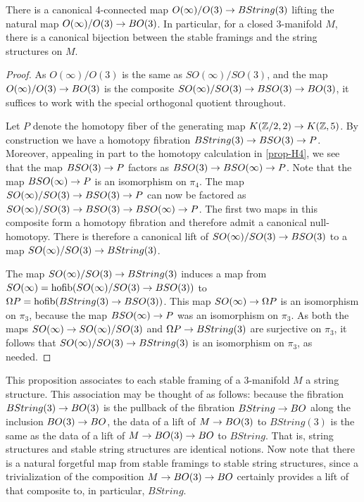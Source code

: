 \documentclass{amsart}
\begin{document}
\begin{proposition}
There is a canonical 4-connected map $O(\infty)/O(3) \rightarrow BString(3)$ lifting the natural map $O(\infty)/O(3) \rightarrow BO(3)$.  In particular, for a closed 3-manifold $M$, there is a canonical bijection between the stable framings and the string structures on $M$.
\end{proposition} 
\begin{proof}
As $O(\infty)/O(3)$ is the same as $SO(\infty)/SO(3)$, and the map $O(\infty)/O(3) \rightarrow BO(3)$ is the composite $SO(\infty)/SO(3) \rightarrow BSO(3) \rightarrow BO(3)$, it suffices to work with the special orthogonal quotient throughout.

Let $P$ denote the homotopy fiber of the generating map $K(\mathbb Z/2,2) \rightarrow K(\mathbb Z,5)$.  By construction we have a homotopy fibration $BString(3) \rightarrow BSO(3) \rightarrow P$.  Moreover, appealing in part to the homotopy calculation in \cref{prop-H4}, we see that the map $BSO(3) \rightarrow P$ factors as $BSO(3) \rightarrow BSO(\infty) \rightarrow P$.  Note that the map $BSO(\infty) \rightarrow P$ is an isomorphism on $\pi_4$.  The map $SO(\infty)/SO(3) \rightarrow BSO(3) \rightarrow P$ can now be factored as $SO(\infty)/SO(3) \rightarrow BSO(3) \rightarrow BSO(\infty) \rightarrow P$.  The first two maps in this composite form a homotopy fibration and therefore admit a canonical null-homotopy.  There is therefore a canonical lift of $SO(\infty)/SO(3) \rightarrow BSO(3)$ to a map $SO(\infty)/SO(3) \rightarrow BString(3)$.

The map $SO(\infty)/SO(3) \rightarrow BString(3)$ induces a map from $SO(\infty) = \operatorname{hofib}(SO(\infty)/SO(3) \rightarrow BSO(3))$ to $\Omega P = \operatorname{hofib}(BString(3) \rightarrow BSO(3))$.  This map $SO(\infty) \rightarrow \Omega P$ is an isomorphism on $\pi_3$, because the map $BSO(\infty) \rightarrow P$ was an isomorphism on $\pi_3$.  As both the maps $SO(\infty) \rightarrow SO(\infty)/SO(3)$ and $\Omega P \rightarrow BString(3)$ are surjective on $\pi_3$, it follows that $SO(\infty)/SO(3) \rightarrow BString(3)$ is an isomorphism on $\pi_3$, as needed.
\end{proof}

This proposition associates to each stable framing of a 3-manifold $M$ a string structure.  This association may be thought of as follows: because the fibration $BString(3) \rightarrow BO(3)$ is the pullback of the fibration $BString \rightarrow BO$ along the inclusion $BO(3) \rightarrow BO$, the data of a lift of $M \rightarrow BO(3)$ to $BString(3)$ is the same as the data of a lift of $M \rightarrow BO(3) \rightarrow BO$ to $BString$.  That is, string structures and stable string structures are identical notions.  Now note that there is a natural forgetful map from stable framings to stable string structures, since a trivialization of the composition $M \rightarrow BO(3) \rightarrow BO$ certainly provides a lift of that composite to, in particular, $BString$.
\end{document}
